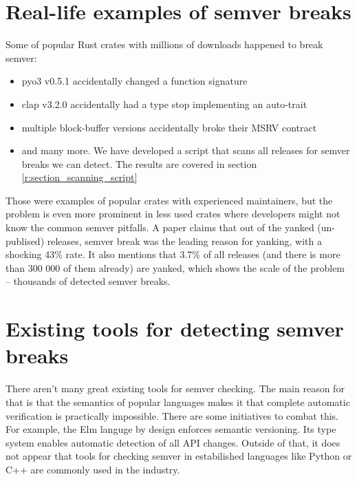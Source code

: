 \documentclass[licencjacka,en]{pracamgr}
\begin{document}
\section{Real-life examples of semver breaks} \label{r:section_real_life_semver_breaks}

Some of popular Rust crates with millions of downloads happened to break semver:
\begin{itemize}
    \item {\ttfamily pyo3 v0.5.1} accidentally changed a function signature \cite{pyo3-issue}
    \item {\ttfamily clap v3.2.0} accidentally had a type stop implementing an auto-trait \cite{clap-issue}
    \item multiple {\ttfamily block-buffer} versions accidentally broke their MSRV contract \cite{block-buffer-issue}
    \item and many more. We have developed a script that scans all releases
		for semver breaks we can detect. The results are covered in section \ref{r:section_scanning_script}
\end{itemize}

Those were examples of popular crates with experienced maintainers, but the problem is even more prominent in less used crates
where developers might not know the common semver pitfalls. A paper \cite{paper}
claims that out of the yanked (un-publised) releases,
semver break was the leading reason for yanking, with a shocking 43\% rate.
It also mentions that 3.7\% of all releases (and there is more than 300 000 of them already)
are yanked, which shows the scale of the problem -- thousands of detected semver breaks.

\section{Existing tools for detecting semver breaks}\label{r:section_existing_semver_tools}

There aren't many great existing tools for semver checking.
The main reason for that is that the semantics of popular languages
makes it that complete automatic verification is practically impossible.
There are some initiatives to combat this. For example,
the Elm languge\cite{elm-lang} by design enforces semantic versioning.
Its type system enables automatic detection of all API changes.
Outside of that, it does not appear that tools for checking semver
in estabilished languages like Python or C++ are commonly used in the industry.
\end{document}
